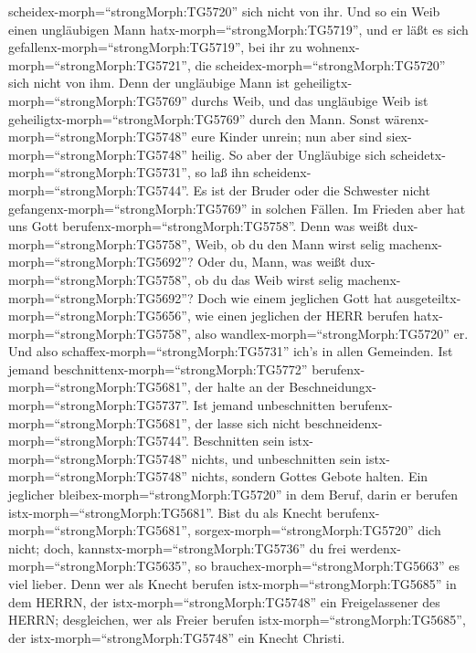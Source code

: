 scheidex-morph=``strongMorph:TG5720'' sich nicht von ihr. 
Und so ein Weib einen ungläubigen Mann
hatx-morph=``strongMorph:TG5719'', und er läßt es sich
gefallenx-morph=``strongMorph:TG5719'', bei ihr zu
wohnenx-morph=``strongMorph:TG5721'', die
scheidex-morph=``strongMorph:TG5720'' sich nicht von ihm. 
Denn der ungläubige Mann ist geheiligtx-morph=``strongMorph:TG5769''
durchs Weib, und das ungläubige Weib ist
geheiligtx-morph=``strongMorph:TG5769'' durch den Mann. Sonst
wärenx-morph=``strongMorph:TG5748'' eure Kinder unrein; nun aber sind
siex-morph=``strongMorph:TG5748'' heilig.  So aber der
Ungläubige sich scheidetx-morph=``strongMorph:TG5731'', so laß ihn
scheidenx-morph=``strongMorph:TG5744''. Es ist der Bruder oder die
Schwester nicht gefangenx-morph=``strongMorph:TG5769'' in solchen
Fällen. Im Frieden aber hat uns Gott
berufenx-morph=``strongMorph:TG5758''.  Denn was weißt
dux-morph=``strongMorph:TG5758'', Weib, ob du den Mann wirst selig
machenx-morph=``strongMorph:TG5692''? Oder du, Mann, was weißt
dux-morph=``strongMorph:TG5758'', ob du das Weib wirst selig
machenx-morph=``strongMorph:TG5692''?  Doch wie einem
jeglichen Gott hat ausgeteiltx-morph=``strongMorph:TG5656'', wie einen
jeglichen der HERR berufen hatx-morph=``strongMorph:TG5758'', also
wandlex-morph=``strongMorph:TG5720'' er. Und also
schaffex-morph=``strongMorph:TG5731'' ich's in allen Gemeinden.
 Ist jemand beschnittenx-morph=``strongMorph:TG5772''
berufenx-morph=``strongMorph:TG5681'', der halte an der
Beschneidungx-morph=``strongMorph:TG5737''. Ist jemand unbeschnitten
berufenx-morph=``strongMorph:TG5681'', der lasse sich nicht
beschneidenx-morph=``strongMorph:TG5744''.  Beschnitten
sein istx-morph=``strongMorph:TG5748'' nichts, und unbeschnitten sein
istx-morph=``strongMorph:TG5748'' nichts, sondern Gottes Gebote halten.
 Ein jeglicher bleibex-morph=``strongMorph:TG5720'' in dem
Beruf, darin er berufen istx-morph=``strongMorph:TG5681''. 
Bist du als Knecht berufenx-morph=``strongMorph:TG5681'',
sorgex-morph=``strongMorph:TG5720'' dich nicht; doch,
kannstx-morph=``strongMorph:TG5736'' du frei
werdenx-morph=``strongMorph:TG5635'', so
brauchex-morph=``strongMorph:TG5663'' es viel lieber.  Denn
wer als Knecht berufen istx-morph=``strongMorph:TG5685'' in dem HERRN,
der istx-morph=``strongMorph:TG5748'' ein Freigelassener des HERRN;
desgleichen, wer als Freier berufen istx-morph=``strongMorph:TG5685'',
der istx-morph=``strongMorph:TG5748'' ein Knecht Christi. 
